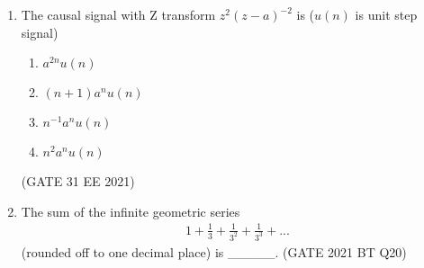 \begin{enumerate}[label=\thechapter.\arabic*,ref=\thechapter.\theenumi]
\item The causal signal with Z transform $z^2(z - a)^{-2}$ is ($u(n)$ is unit step signal)
\begin{enumerate}
    \item $a^{2n}u(n)$
    \item $(n + 1)a^nu(n)$
    \item $n^{-1}a^nu(n)$
    \item $n^2a^nu(n)$
\end{enumerate}

\hfill(GATE 31 EE 2021) 

\solution

\pagebreak

\item The sum of the infinite geometric series
\begin{align}
    1 + \frac{1}{3} + \frac{1}{3^2} + \frac{1}{3^3} + ... \nonumber
\end{align}
(rounded off to one decimal place) is \_\_\_\_\_.
\hfill(GATE 2021 BT Q20)\\
\solution

\pagebreak
\end{enumerate}
